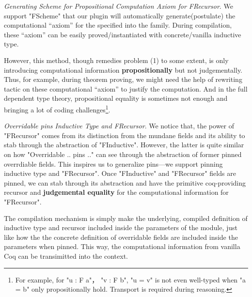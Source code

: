 \textit{Generating Scheme for Propositional Computation Axiom for FRecursor}. We support "FScheme" that our plugin will automatically generate(postulate) the computational ``axiom'' for the specified  into the family. During compilation, these ``axiom'' can be easily proved/instantiated with concrete/vanilla inductive type.

However, this method, though remedies problem (1) to some extent, is only introducing computational information \textbf{propositionally} but not judgementally. Thus, for example, during theorem proving, we might need the help of rewriting tactic on these computational ``axiom'' to justify the computation. And in the full dependent type theory, propositional equality is sometimes not enough and bringing a lot of coding challenges\footnote{For example, for "u : F a"， "v : F b", "u = v" is not even well-typed when "a = b" only propositionally hold. Transport is required during reasoning.}.



\textit{Overridable pins Inductive Type and FRecursor}. We notice that, the power of "FRecursor" comes from its distinction from the mundane fields and its ability to stab through the abstraction of "FInductive". However, the latter is quite similar on how "Overridable .. pins {..}" can see through the abstraction of former pinned overrdiable fields. This inspires us to generalize pins---we support pinning inductive type and "FRecursor". Once "FInductive" and "FRecursor" fields are pinned, we can stab through its abstraction and have the primitive coq-providing recursor and \textbf{judgemental equality} for the computational information for "FRecursor". 

The compilation mechanism is simply make the underlying, compiled definition of inductive type and recursor included inside the parameters of the module, just like how the the concrete definition of overridable fields are included inside the parameters when pinned. This way, the computational information from vanilla Coq can be transimitted into the context.  


